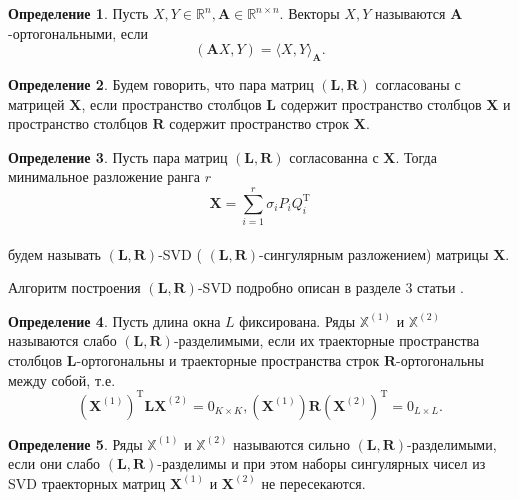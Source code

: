 \documentclass[specialist, substylefile = spbureport.rtx, subf,href,colorlinks=true, 12pt]{disser}
\theoremstyle{definition}
\newtheorem{definition}{Определение}
\begin{document}
\begin{definition}
    Пусть $X, Y \in \mathbb{R}^n, \mathbf{A} \in \mathbb{R}^{n \times n}$. Векторы $X, Y$ называются $\mathbf{A}$-ортогональными, если
    \begin{equation*}
        (\mathbf{A}X, Y) =  \langle X, Y\rangle _{\mathbf{A}}.
    \end{equation*}
\end{definition}
\begin{definition}
    Будем говорить, что пара матриц $(\mathbf{L}, \mathbf{R})$ согласованы с матрицей $\mathbf{X}$, если пространство столбцов $\mathbf{L}$ содержит пространство столбцов $\mathbf{X}$ и пространство столбцов $\mathbf{R}$ содержит пространство строк $\mathbf{X}$.
\end{definition}
\begin{definition}
    Пусть пара матриц $(\mathbf{L}, \mathbf{R})$ согласованна с $\mathbf{X}$. Тогда минимальное разложение ранга $r$
    \begin{equation*}
        \mathbf{X} = \sum_{i = 1}^{r}\sigma_iP_iQ_i^{\mathrm{T}}
    \end{equation*}\\
    будем называть $(\mathbf{L}, \mathbf{R})$-SVD ( $(\mathbf{L}, \mathbf{R})$-сингулярным разложением) матрицы $\mathbf{X}$.
\end{definition}

Алгоритм построения $(\mathbf{L}, \mathbf{R})$-SVD подробно описан в разделе 3 статьи \cite{Golyandina15}.

\begin{definition}
    Пусть длина окна $L$ фиксирована. Ряды $\mathbb{X}^{(1)}$ и $\mathbb{X}^{(2)}$ называются слабо $(\mathbf{L}, \mathbf{R})$-разделимыми, если их траекторные пространства столбцов $\mathbf{L}$-ортогональны и траекторные пространства строк $\mathbf{R}$-ортогональны между собой, т.е.
    \begin{equation*}
        (\mathbf{X}^{(1)})^{\mathrm{T}}\mathbf{LX}^{(2)} = 0_{K \times K}, (\mathbf{X}^{(1)})\mathbf{R}(\mathbf{X}^{(2)})^{\mathrm{T}} = 0_{L \times L}.
    \end{equation*}

\end{definition}

\begin{definition}
    Ряды $\mathbb{X}^{(1)}$ и $\mathbb{X}^{(2)}$ называются сильно $(\mathbf{L}, \mathbf{R})$-разделимыми, если они слабо $(\mathbf{L}, \mathbf{R})$-разделимы и при этом наборы сингулярных чисел из SVD траекторных матриц $\mathbf{X}^{(1)}$ и $\mathbf{X}^{(2)}$ не пересекаются.
\end{definition}
\end{document}
